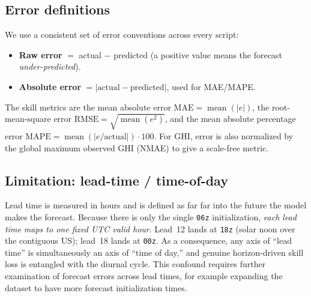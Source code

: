 \subsection{Error definitions}\label{sec:errordefs}

We use a consistent set of error conventions across every script:
\begin{itemize}
  \item \textbf{Raw error} $=$ actual $-$ predicted (a positive value means the forecast
        \emph{under-predicted}).
  \item \textbf{Absolute error} $= |\text{actual} - \text{predicted}|$, used for MAE/MAPE.
\end{itemize}

The skill metrics are the mean absolute error
$\text{MAE} = \operatorname{mean}(|e|)$, the root-mean-square error
$\text{RMSE} = \sqrt{\operatorname{mean}(e^2)}$, and the mean absolute percentage error
$\text{MAPE} = \operatorname{mean}(|e/\text{actual}|)\cdot 100$. For GHI, error is also
normalized by the global maximum observed GHI (NMAE) to give a scale-free metric.

\subsection{Limitation: lead-time / time-of-day}\label{sec:confound}

Lead time is measured in hours and is defined as far far into the future the model makes the forecast. Because there is only the single \texttt{06z} initialization, \emph{each lead time maps to one
fixed UTC valid hour}. Lead~12 lands at
\texttt{18z} (solar noon over the contiguous US); lead~18 lands at \texttt{00z}. As a
consequence, any axis of ``lead time'' is simultaneously an axis of ``time of day,'' and genuine
horizon-driven skill loss is entangled with the diurnal cycle. This confound requires further examination of forecast errors across lead times, for example expanding the dataset to have more forecast initialization times.

